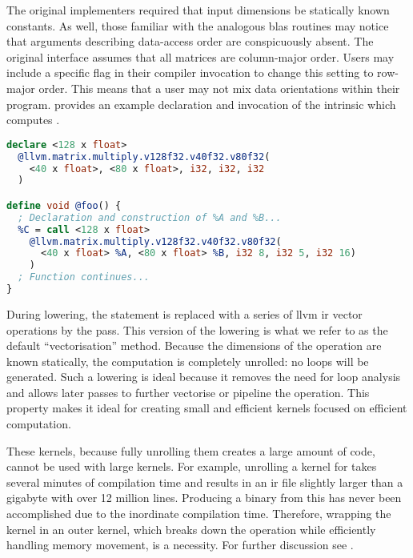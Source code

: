 \documentclass[\main/thesis.tex]{subfiles}
\begin{document}
The original implementers required that input dimensions be statically known constants.
As well, those familiar with the analogous \gls{blas} routines may notice that arguments describing data-access order are conspicuously absent.
The original interface assumes that all matrices are column-major order.
Users may include a specific flag in their compiler invocation to change this setting to row-major order.
This means that a user may not mix data orientations within their program.
 provides an example declaration and invocation of the intrinsic which computes .

\begin{lstlisting}[caption={[Example Declaration and Use of \code{llvm.matrix.multiply.*}]An example declaration and usage of the \code{llvm.matrix.multiply.*} intrinsic.},
      label=lst:matMulIntr,language=llvm,float,columns=flexible]
declare <128 x float>
  @llvm.matrix.multiply.v128f32.v40f32.v80f32(
    <40 x float>, <80 x float>, i32, i32, i32
  )

define void @foo() {
  ; Declaration and construction of %A and %B...
  %C = call <128 x float>
    @llvm.matrix.multiply.v128f32.v40f32.v80f32(
      <40 x float> %A, <80 x float> %B, i32 8, i32 5, i32 16)
    )
  ; Function continues...
}
\end{lstlisting}

During lowering, the  statement is replaced with a series of \gls{llvm} \gls{ir} vector operations by the  pass.
This version of the lowering is what we refer to as the default ``vectorisation'' method.
Because the dimensions of the operation are known statically, the computation is completely unrolled: no loops will be generated.
Such a lowering is ideal because it removes the need for loop analysis and allows later passes to further vectorise or pipeline the operation.
This property makes it ideal for creating small and efficient kernels focused on efficient computation.

These kernels, because fully unrolling them creates a large amount of code, cannot be used with large kernels.
For example, unrolling a kernel for  takes several minutes of compilation time and results in an \gls{ir} file slightly larger than a gigabyte with over 12 million lines.
Producing a binary from this has never been accomplished due to the inordinate compilation time.
Therefore, wrapping the kernel in an outer kernel, which breaks down the operation while efficiently handling memory movement, is a necessity.
For further discussion see .
\end{document}
